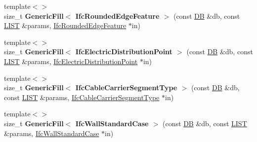 \begin{DoxyCompactItemize}
\item 
\hypertarget{namespace_assimp_1_1_s_t_e_p_ac70298c0944d54b0c926357c2bbfa653}{{\footnotesize template$<$$>$ }\\size\+\_\+t {\bfseries Generic\+Fill$<$ Ifc\+Rounded\+Edge\+Feature $>$} (const \hyperlink{class_assimp_1_1_s_t_e_p_1_1_d_b}{D\+B} \&db, const \hyperlink{class_assimp_1_1_s_t_e_p_1_1_e_x_p_r_e_s_s_1_1_l_i_s_t}{L\+I\+S\+T} \&params, \hyperlink{struct_assimp_1_1_i_f_c_1_1_ifc_rounded_edge_feature}{Ifc\+Rounded\+Edge\+Feature} $\ast$in)}\label{namespace_assimp_1_1_s_t_e_p_ac70298c0944d54b0c926357c2bbfa653}

\item 
\hypertarget{namespace_assimp_1_1_s_t_e_p_adbe9f5a0dfba919515ab06bbfd9a371c}{{\footnotesize template$<$$>$ }\\size\+\_\+t {\bfseries Generic\+Fill$<$ Ifc\+Electric\+Distribution\+Point $>$} (const \hyperlink{class_assimp_1_1_s_t_e_p_1_1_d_b}{D\+B} \&db, const \hyperlink{class_assimp_1_1_s_t_e_p_1_1_e_x_p_r_e_s_s_1_1_l_i_s_t}{L\+I\+S\+T} \&params, \hyperlink{struct_assimp_1_1_i_f_c_1_1_ifc_electric_distribution_point}{Ifc\+Electric\+Distribution\+Point} $\ast$in)}\label{namespace_assimp_1_1_s_t_e_p_adbe9f5a0dfba919515ab06bbfd9a371c}

\item 
\hypertarget{namespace_assimp_1_1_s_t_e_p_a55dbc25ef300cef4f30f69b168baa720}{{\footnotesize template$<$$>$ }\\size\+\_\+t {\bfseries Generic\+Fill$<$ Ifc\+Cable\+Carrier\+Segment\+Type $>$} (const \hyperlink{class_assimp_1_1_s_t_e_p_1_1_d_b}{D\+B} \&db, const \hyperlink{class_assimp_1_1_s_t_e_p_1_1_e_x_p_r_e_s_s_1_1_l_i_s_t}{L\+I\+S\+T} \&params, \hyperlink{struct_assimp_1_1_i_f_c_1_1_ifc_cable_carrier_segment_type}{Ifc\+Cable\+Carrier\+Segment\+Type} $\ast$in)}\label{namespace_assimp_1_1_s_t_e_p_a55dbc25ef300cef4f30f69b168baa720}

\item 
\hypertarget{namespace_assimp_1_1_s_t_e_p_ada83b61dda22942bb9b1886ed6b0d63e}{{\footnotesize template$<$$>$ }\\size\+\_\+t {\bfseries Generic\+Fill$<$ Ifc\+Wall\+Standard\+Case $>$} (const \hyperlink{class_assimp_1_1_s_t_e_p_1_1_d_b}{D\+B} \&db, const \hyperlink{class_assimp_1_1_s_t_e_p_1_1_e_x_p_r_e_s_s_1_1_l_i_s_t}{L\+I\+S\+T} \&params, \hyperlink{struct_assimp_1_1_i_f_c_1_1_ifc_wall_standard_case}{Ifc\+Wall\+Standard\+Case} $\ast$in)}\label{namespace_assimp_1_1_s_t_e_p_ada83b61dda22942bb9b1886ed6b0d63e}


\end{DoxyCompactItemize}
